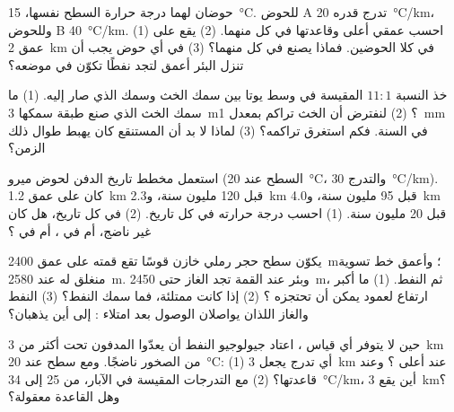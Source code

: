 \begin{exercise}[$\star\star$]\label{exo:g11:fossil-fuel-geology:6}
حوضان لهما درجة حرارة السطح نفسها، \qty{15}{\degreeCelsius}.
للحوض A تدرج قدره \qty{20}{\degreeCelsius/km}، وللحوض B
\qty{40}{\degreeCelsius/km}. (1) احسب عمقي أعلى  وقاعدتها
في كل منهما. (2) يقع  على عمق \qty{2}{km} في كلا
الحوضين. فماذا يصنع في كل منهما؟ (3) في أي حوض يجب أن تنزل البئر أعمق
لتجد نفطًا تكوّن في موضعه؟
\end{exercise}

\begin{exercise}[$\star\star$]\label{exo:g11:fossil-fuel-geology:7}
خذ النسبة $11{:}1$ المقيسة في وسط يوتا بين سمك
الخث وسمك  الذي صار إليه. (1) ما سمك الخث الذي صنع طبقة 
سمكها \qty{3}{m}؟ (2) لنفترض أن الخث تراكم بمعدل \qty{1}{mm} في السنة.
فكم استغرق تراكمه؟ (3) لماذا لا بد أن المستنقع كان يهبط
طوال ذلك الزمن؟
\end{exercise}

\begin{exercise}[$\star\star$]\label{exo:g11:fossil-fuel-geology:8}
استعمل مخطط تاريخ الدفن لحوض ميرو (السطح عند
\qty{20}{\degreeCelsius}، والتدرج \qty{30}{\degreeCelsius/km}). كان 
على عمق \qty{1.2}{km} قبل 120 مليون سنة، و\qty{2.3}{km} قبل 95
مليون سنة، و\qty{4.0}{km} قبل 20 مليون سنة. (1) احسب
درجة حرارته في كل تاريخ. (2) في كل تاريخ، هل كان غير ناضج، أم في ، أم في ؟
\end{exercise}

\begin{exercise}[$\star\star$]\label{exo:g11:fossil-fuel-geology:9}
يكوّن سطح حجر رملي خازن قوسًا تقع قمته على عمق \qty{2400}{m}؛
وأعمق خط تسوية منغلق له عند \qty{2580}{m}. وبئر عند القمة
تجد الغاز حتى \qty{2450}{m}، ثم النفط. (1) ما أكبر ارتفاع
لعمود يمكن أن تحتجزه ؟ (2) إذا كانت  ممتلئة، فما سمك النفط؟
(3) النفط والغاز اللذان يواصلان الوصول بعد امتلاء : إلى أين
يذهبان؟
\end{exercise}

\begin{exercise}[$\star\star$]\label{exo:g11:fossil-fuel-geology:10}
حين لا يتوفر أي قياس ، اعتاد جيولوجيو النفط أن يعدّوا
 المدفون تحت أكثر من \qty{3}{km} من الصخور ناضجًا.
ومع سطح عند \qty{20}{\degreeCelsius}: (1) أي تدرج يجعل
\qty{3}{km} عند أعلى ؟ وعند قاعدتها؟ (2) مع
التدرجات المقيسة في الآبار، من 25 إلى \qty{34}{\degreeCelsius/km}،
أين يقع \qty{3}{km}؟ وهل القاعدة معقولة؟
\end{exercise}


